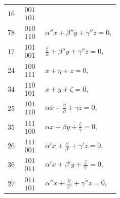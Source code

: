 \documentclass[11pt]{article}
\begin{document}
\begin{center}
\begin{tabular}{c l l}
$16$ & $\begin{smallmatrix}001\\101\end{smallmatrix}$ & \\[3pt]
$78$ & $\begin{smallmatrix}010\\110\end{smallmatrix}$ & $\alpha'' x + \beta'' y + \gamma'' z = 0,$\\[3pt]
$17$ & $\begin{smallmatrix}101\\001\end{smallmatrix}$ & $\tfrac{\xi}{\alpha} + \beta'' y + \gamma'' z = 0,$\\[3pt]
$24$ & $\begin{smallmatrix}100\\111\end{smallmatrix}$ & $x + \eta + z = 0,$\\[3pt]
$34$ & $\begin{smallmatrix}110\\101\end{smallmatrix}$ & $x + y + \zeta = 0,$\\[3pt]
$25$ & $\begin{smallmatrix}101\\110\end{smallmatrix}$ & $\alpha x + \tfrac{\eta}{\beta} + \gamma z = 0,$\\[3pt]
$35$ & $\begin{smallmatrix}111\\100\end{smallmatrix}$ & $\alpha x + \beta y + \tfrac{\zeta}{\gamma} = 0,$\\[3pt]
$26$ & $\begin{smallmatrix}111\\001\end{smallmatrix}$ & $\alpha' x + \tfrac{\eta}{\beta'} + \gamma' z = 0,$\\[3pt]
$36$ & $\begin{smallmatrix}101\\011\end{smallmatrix}$ & $\alpha' x + \beta' y + \tfrac{\zeta}{\gamma'} = 0,$\\[3pt]
$27$ & $\begin{smallmatrix}011\\101\end{smallmatrix}$ & $\alpha'' x + \tfrac{\eta}{\beta''} + \gamma'' z = 0,$\\[3pt]

\end{tabular}
\end{center}
\end{document}
